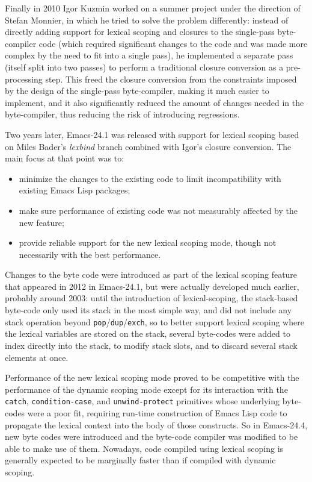 \documentclass[format=acmsmall, review]{acmart}
\newcommand \Elisp {Emacs Lisp}
\begin{document}
Finally in 2010 Igor Kuzmin worked on a summer project under the direction
of Stefan Monnier, in which he tried to solve the problem differently:
instead of directly adding support for lexical scoping and closures to the
single-pass byte-compiler code (which required significant changes to the
code and was made more complex by the need to fit into a single pass), he
implemented a separate pass (itself split into two passes) to perform
a traditional closure conversion as a pre-processing step.  This freed the
closure conversion from the constraints imposed by the design of the
single-pass byte-compiler, making it much easier to implement, and it also
significantly reduced the amount of changes needed in the byte-compiler,
thus reducing the risk of introducing regressions.

Two years later, Emacs-24.1 was released with support for lexical
scoping based on Miles Bader's \emph{lexbind} branch combined with Igor's
closure conversion.  The main focus at that point was to:
\begin{itemize}
\item minimize the changes to the existing code to limit incompatibility
  with existing \Elisp{} packages;
\item make sure performance of existing code was not measurably affected by
  the new feature;
\item provide reliable support for the new lexical scoping mode, though not
  necessarily with the best performance.
\end{itemize}
Changes to the byte code were introduced as part of the lexical scoping
feature that appeared in 2012 in Emacs-24.1, but were actually developed
much earlier, probably around 2003: until the introduction of
lexical-scoping, the stack-based byte-code only used its stack in the most
simple way, and did not include any stack operation beyond
\texttt{pop}/\texttt{dup}/\texttt{exch}, so to better support lexical
scoping where the lexical variables are stored on the stack, several
byte-codes were added to index directly into the stack, to modify stack
slots, and to discard several stack elements at once.

Performance of the new lexical scoping mode proved to be competitive with
the performance of the dynamic scoping mode except for its interaction with
the \texttt{catch}, \texttt{condition-case}, and \texttt{unwind-protect}
primitives whose underlying byte-codes were a poor fit, requiring run-time
construction of \Elisp{} code to propagate the lexical context into the body
of those constructs.
So in Emacs-24.4, new byte codes were introduced and
the byte-code compiler was modified to be able to make use of them.  Nowadays,
code compiled using lexical scoping is generally expected to be marginally
faster than if compiled with dynamic scoping.
\end{document}
